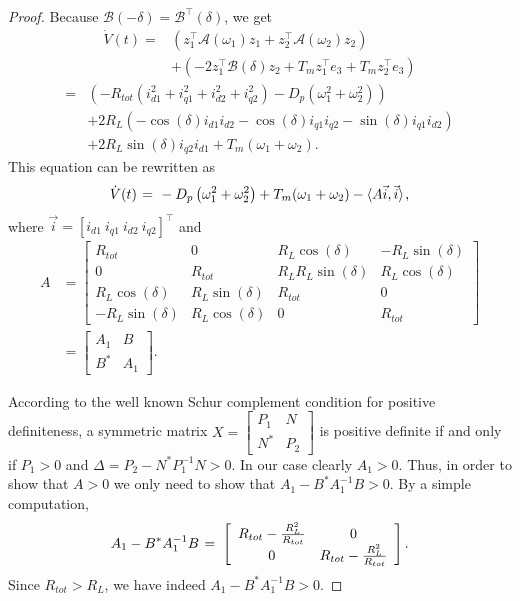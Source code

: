 \documentclass[letterpaper,10pt,conference]{ieeeconf}
\renewcommand{\o}    {{\omega}}
\newcommand{\m}      {{\hbox{\hskip 1pt}}}
\begin{document}
\begin{proof}
Because $\mathcal{B}(-\delta) = \mathcal{B}^\top(\delta)$, we get 
$$ \begin{aligned} \dot{V}(t) =& \left(z_1^\top\mathcal{A}(\o_1)
   z_1+z_2^\top\mathcal{A}(\o_2)z_2\right) \\ &+ \left(-2z_1^\top
   \mathcal{B}(\delta)z_2 + T_mz_1^\top e_3+ T_mz_2^\top e_3\right)
   \end{aligned}$$
$$ \begin{aligned} =& \left(-R_{tot}\left(i_{d1}^2 +
   i_{q1}^2+i_{d2}^2+i_{q2}^2 \right)-D_p \left(\o_1^2+\o_2^2\right)
   \right) \\ & +2 R_L \left(-\cos(\delta)i_{d1}i_{d2}-\cos(\delta)
   i_{q1}i_{q2}-\sin(\delta)i_{q1}i_{d2}\right)\\ &+2 R_L
   \sin(\delta)i_{q2}i_{d1} + T_m(\o_1+\o_2).\end{aligned}$$
This equation can be rewritten as
$$ \dot{V}(t) \m=\m -D_p\left( \o_1^2+\o_2^2\right) + T_m(\o_1+\o_2)
   -\langle A\vec{i},\vec{i} \rangle \m,$$ 
where $\vec{i}=[i_{d1}\ i_{q1}\ i_{d2}\ i_{q2}]^\top$ and 
$$ \begin{aligned} A &=\left[\begin{array}{cc|cc} R_{tot} & 0 & R_L 
   \cos(\delta) & -R_L \sin(\delta) \\ 0 & R_{tot} & R_L R_L 
   \sin(\delta) & R_L\cos(\delta) \\ \hline R_L\cos(\delta) & R_L 
   \sin(\delta) & R_{tot} & 0 \\ -R_L \sin(\delta) & R_L\cos(\delta) 
   & 0 & R_{tot} \end{array}\right]\\ &= \left[ \begin{array}{c|c}
   A_1 & B \\ \hline B^* & A_1 \end{array} \right].\end{aligned}$$

According to the well known Schur complement condition for positive
definiteness, a symmetric matrix $X = \left[ \begin{array}{c|c} P_1 &
N \\ \hline N^* & P_2 \end{array}\right]$ is positive definite if and
only if $P_1>0$ and $\Delta=P_2-N^*P_1^{-1}N>0$. In our case clearly
$A_1>0$. Thus, in order to show that $A>0$ we only need to show that 
$A_1-B^*A_1^{-1}B>0$. By a simple computation,
$$ A_1-B^*A_1^{-1}B \m=\m \left[\begin{array}{cc}
   R_{tot}-\frac{R_L^2}{R_{tot}} & 0  \\ 
   0 & R_{tot}-\frac{R_L^2}{R_{tot}} \end{array}\right].$$
Since $R_{tot}>R_L$, we have indeed $A_1-B^*A_1^{-1}B>0$. 


\end{proof}
\end{document}
